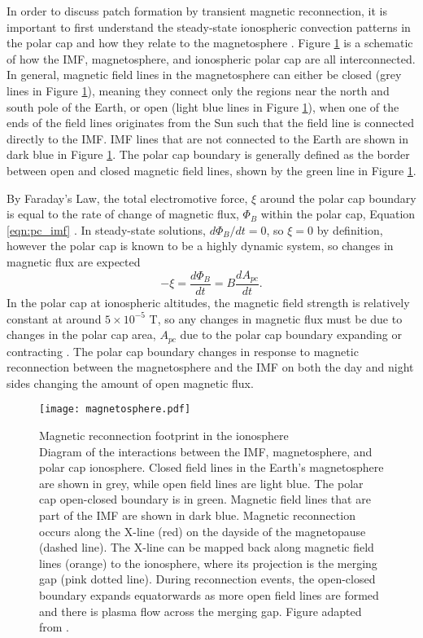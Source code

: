 In order to discuss patch formation by transient magnetic reconnection, it is important to first understand the steady-state ionospheric convection patterns in the polar cap and how they relate to the magnetosphere \citep{Cowley1980}.  Figure \ref{fig:magnetosphere} is a schematic of how the IMF, magnetosphere, and ionospheric polar cap are all interconnected.  In general, magnetic field lines in the magnetosphere can either be closed (grey lines in Figure \ref{fig:magnetosphere}), meaning they connect only the regions near the north and south pole of the Earth, or open (light blue lines in Figure \ref{fig:magnetosphere}), when one of the ends of the field lines originates from the Sun such that the field line is connected directly to the IMF.  IMF lines that are not connected to the Earth are shown in dark blue in Figure \ref{fig:magnetosphere}.  The polar cap boundary is generally defined as the border between open and closed magnetic field lines, shown by the green line in Figure \ref{fig:magnetosphere}.

By Faraday's Law, the total electromotive force, \(\xi\) around the polar cap boundary is equal to the rate of change of magnetic flux, \(\Phi_B\) within the polar cap, Equation \ref{eqn:pc_imf} \citep{Lockwood1992a}.  In steady-state solutions, \(d\Phi_B/dt = 0\), so \(\xi=0\) by definition, however the polar cap is known to be a highly dynamic system, so changes in magnetic flux are expected
\begin{equation}
	\label{eqn:pc_imf}
	-\xi = \frac{d\Phi_B}{dt} = B\frac{dA_{pc}}{dt}.
\end{equation}
In the polar cap at ionospheric altitudes, the magnetic field strength is relatively constant at around \(5\times 10^{-5}\) T, so any changes in magnetic flux must be due to changes in the polar cap area, \(A_{pc}\) due to the polar cap boundary expanding or contracting \citep{Lockwood1992a}.  The polar cap boundary changes in response to magnetic reconnection between the magnetosphere and the IMF  on both the day and night sides changing the amount of open magnetic flux.


\begin{figure}
	\centering
	\texttt{[image: magnetosphere.pdf]}
	\caption[Magnetic reconnection footprint in the ionosphere]{{\:}Magnetic reconnection footprint in the ionosphere\\ Diagram of the interactions between the IMF, magnetosphere, and polar cap ionosphere.  Closed field lines in the Earth's magnetosphere are shown in grey, while open field lines are light blue.  The polar cap open-closed boundary is in green.  Magnetic field lines that are part of the IMF are shown in dark blue.  Magnetic reconnection occurs along the X-line (red) on the dayside of the magnetopause (dashed line).  The X-line can be mapped back along magnetic field lines (orange) to the ionosphere, where its projection is the merging gap (pink dotted line).  During reconnection events, the open-closed boundary expands equatorwards as more open field lines are formed and there is plasma flow across the merging gap. Figure adapted from \citet{Cowley1991}.}
	\label{fig:magnetosphere}
\end{figure}

